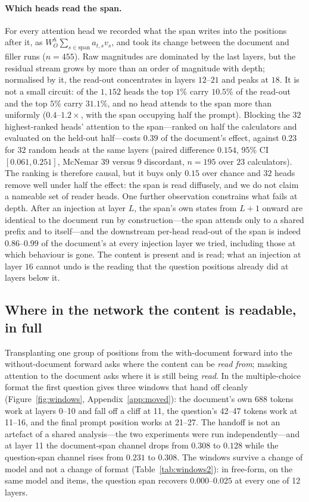 \documentclass{article}
\begin{document}
\paragraph{Which heads read the span.} For every attention head we recorded what
the span writes into the positions after it, as
$W_O^h \sum_{s \in \text{span}} a_{t,s} v_s$, and took its change between the
document and filler runs ($n=455$). Raw magnitudes are dominated by the last
layers, but the residual stream grows by more than an order of magnitude with
depth; normalised by it, the read-out concentrates in layers $12$--$21$ and
peaks at $18$. It is not a small circuit: of the $1{,}152$ heads the top $1\%$
carry $10.5\%$ of the read-out and the top $5\%$ carry $31.1\%$, and no head
attends to the span more than uniformly ($0.4$--$1.2\times$, with the span
occupying half the prompt). Blocking the $32$ highest-ranked heads' attention to
the span---ranked on half the calculators and evaluated on the held-out
half---costs $0.39$ of the document's effect, against $0.23$ for $32$ random
heads at the same layers (paired difference $0.154$, $95\%$ CI $[0.061,0.251]$,
McNemar $39$ versus $9$ discordant, $n=195$ over $23$ calculators). The ranking
is therefore causal, but it buys only $0.15$ over chance and $32$ heads remove
well under half the effect: the span is read diffusely, and we do not claim a
nameable set of reader heads. One further observation constrains what fails at
depth. After an injection at layer $L$, the span's own states from $L+1$ onward
are identical to the document run by construction---the span attends only to a
shared prefix and to itself---and the downstream per-head read-out of the span
is indeed $0.86$--$0.99$ of the document's at every injection layer we tried,
including those at which behaviour is gone. The content is present and is read;
what an injection at layer $16$ cannot undo is the reading that the question
positions already did at layers below it.

\subsection{Where in the network the content is readable, in full}
\label{app:where}

Transplanting one group of positions from the with-document forward into the
without-document forward asks where the content can be \emph{read from}; masking
attention to the document asks where it is still being \emph{read}. In the
multiple-choice format the first question gives three windows that hand off
cleanly (Figure~\ref{fig:windows}, Appendix~\ref{app:moved}): the document's own
688 tokens work at layers 0--10 and fall off a cliff at 11, the question's 42--47
tokens work at 11--16, and the final prompt position works at 21--27. The handoff
is not an artefact of a shared analysis---the two experiments were run
independently---and at layer 11 the document-span channel drops from $0.308$ to
$0.128$ while the question-span channel rises from $0.231$ to $0.308$. The
windows survive a change of model and not a change of format
(Table~\ref{tab:windows2}): in free-form, on the same model and items, the
question span recovers $0.000$--$0.025$ at every one of 12 layers.
\end{document}
